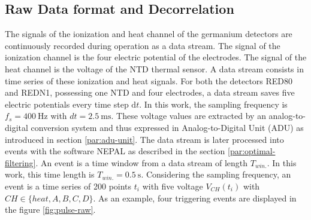 \subsection{Raw Data format and Decorrelation}
\label{par:data-format}

The signals of the ionization and heat channel of the germanium detectors are continuously recorded during operation as a data stream. The signal of the ionization channel is the four electric potential of the electrodes. The signal of the heat channel is the voltage of the NTD thermal sensor. A data stream consists in time series of these ionization and heat signals. For both the detectors RED80 and REDN1, possessing one NTD and four electrodes, a data stream saves five electric potentials every time step $\mathrm{d}t$. In this work, the sampling frequency is $f_s = \SI{400}{\Hz}$ with $dt = \SI{2.5}{\milli\s}$. These voltage values are extracted by an analog-to-digital conversion system and thus expressed in Analog-to-Digital Unit (ADU) as introduced in section \ref{par:adu-unit}. The data stream is later processed into events with the software NEPAL as described in the section \ref{par:optimal-filtering}. An event is a time window from a data stream of length $T_{win.}$. In this work, this time length is $T_{win.}=\SI{0.5}{\s}$. Considering the sampling frequency, an event is a time series of 200 points $t_i$ with five voltage $V_{CH}(t_i)$ with $CH \in \{ heat, A, B, C, D \}$. As an example, four triggering events are displayed in the figure \ref{fig:pulse-raw}.

